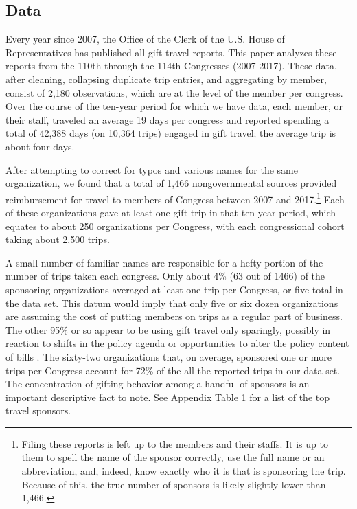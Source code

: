 \documentclass[12pt]{article}                           %
\begin{document}
\subsection*{Data}

Every year since 2007, the Office of the Clerk of the U.S. House of Representatives has published all gift travel reports. This paper analyzes these reports from the 110th through the 114th Congresses (2007-2017). These data, after cleaning, collapsing duplicate trip entries, and aggregating by member, consist of 2,180 observations, which are at the level of the member per congress. Over the course of the ten-year period for which we have data, each member, or their staff, traveled an average 19 days per congress and reported spending a total of 42,388 days (on 10,364 trips) engaged in gift travel; the average trip is about four days.

After attempting to correct for typos and various names for the same organization, we found that a total of 1,466 nongovernmental sources provided reimbursement for travel to members of Congress between 2007 and 2017.\footnote{Filing these reports is left up to the members and their staffs. It is up to them to spell the name of the sponsor correctly, use the full name or an abbreviation, and, indeed, know exactly who it is that is sponsoring the trip. Because of this, the true number of sponsors is likely slightly lower than 1,466.} Each of these organizations gave at least one gift-trip in that ten-year period, which equates to about 250 organizations per Congress, with each congressional cohort taking about 2,500 trips.

A small number of familiar names are responsible for a hefty portion of the number of trips taken each congress. Only about 4\% (63 out of 1466) of the sponsoring organizations averaged at least one trip per Congress, or five total in the data set. This datum would imply that only five or six dozen organizations are assuming the cost of putting members on trips as a regular part of business. The other 95\% or so appear to be using gift travel only sparingly, possibly in reaction to shifts in the policy agenda or opportunities to alter the policy content of bills \citep{Hall1990}. The sixty-two organizations that, on average, sponsored one or more trips per Congress account for 72\% of the all the reported trips in our data set. The concentration of gifting behavior among a handful of sponsors is an important descriptive fact to note. See Appendix Table 1 for a list of the top travel sponsors.
\end{document}
